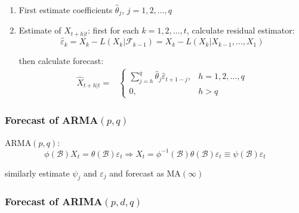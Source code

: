     \begin{enumerate}[topsep=2pt,itemsep=2pt]
        \item First estimate coefficients $ \hat{\theta  }_j $, $ j=1,2,\ldots,q $
        \item Estimate of $ X_{t+h|t} $: first for each $ k=1,2,\ldots,t $, calculate residual estimator:
        \begin{equation}
            \hat{\varepsilon }_{k}=X_{k}-L(X_{k}|\mathscr{F}_{k-1})= X_{k}-L(X_{k}|X_{k-1},\ldots,X_{1})
        \end{equation}
        
        then calculate forecast:
        \begin{align}
            \hat{X}_{t+h|t}=&\begin{cases}
                \sum_{j=h}^q\hat{\theta }_j\hat{\varepsilon }_{t+1-j},&h=1,2,\ldots,q\\
                0,&h>q
            \end{cases}
        \end{align}

    \end{enumerate}
    
\subsubsection{Forecast of ARMA$ (p,q) $}
    ARMA$ (p,q) $:
    \begin{equation}
        \phi (\mathscr{B} )X_t=\theta (\mathscr{B} )\varepsilon _t\Rightarrow X_t=\phi ^{-1}(\mathscr{B} )\theta (\mathscr{B} )\varepsilon _t\equiv \psi (\mathscr{B} )\varepsilon _t
    \end{equation}
        
    similarly estimate $ \psi _j $ and $ \varepsilon _j $ and forecast as MA$ (\infty) $
    
        
\subsubsection{Forecast of ARIMA$ (p,d,q) $}
    


    
        
    
    
    
    
    
    
    